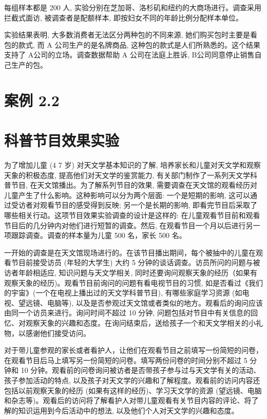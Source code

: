 \documentclass[10pt]{article}
\begin{document}
\begin{CJK*}{UTF8}{bsmi}
每组样本都是 200 人, 实验分别在芝加哥、洛杉矶和纽约的大商场进行。调查采用拦截式面访, 被调查者是配额样本, 即按妇女不同的年龄比例分配样本单位。

实验结果表明, 大多数消费者无法区分两种包的不同来源, 她们购买包时主要是看包的款式, 而 A 公司生产的是名牌商品, 这种包的款式是人们所熟悉的。这个结果支持了 $\mathrm{A}$公司的立场。调查数据帮助 A 公司在法庭上胜诉, B公司同意停止销售自己生产的包。

\section*{案例 2.2}
\section*{科普节目效果实验}
为了增加儿童 (4 7 岁) 对天文学基本知识的了解, 培养家长和儿童对天文学和观察天象的积极态度, 提高他们对天文学的鉴赏能力, 有关部门制作了一系列天文学科普节目, 在天文馆播出。为了解系列节目的效果, 需要调查在天文馆的观看经历对儿童产生了什么影响。这种影响可以分为两个层面: 一个是短期的影响, 这可以通过受访者对观看节目的感受得到反映; 另一个是长期的影响, 即看完节目后采取了哪些相关行动。这项节目效果实验调查的设计是这样的: 在儿童观看节目前和观看节目后的几分钟内对他们进行短暂的调查。然后, 在观看节目一个月以后进行另一项跟踪调查。调查的样本量为儿童 500 名，家长 500 名。

一开始的调查是在天文馆现场进行的。在该节目播出期间，每个被抽中的儿童在观看节目前接受访员 (年轻的大学生) 大约 5 分钟的谈话调查。访员所问的问题与被访者年龄相适应, 知识问题与天文学相关, 同时还要询问观察天象的经历（如果有观察天象的经历)。观看节目前询问的问题有看电视节目的习惯, 如是否看过《我们的宇宙》(一个在电视上播出过的天文学科普节目), 有哪些家庭学习资源 (如电视、望远镜、电脑等), 以及是否参观过天文馆或者类似的地方。观看后的询问应该由同一个访员来进行。询问时间不超过 10 分钟, 问题包括对节目中有关信息的回忆、对观察天象的兴趣和态度。在询问结束后，送给孩子一个和天文学相关的小礼物，以感谢他们接受访问。

对于带儿童参观的家长或者看护人，让他们在观看节目之前填写一份简短的问卷，在观看节目后马上填写另一份简短的问卷。填写两份问卷的时间分别不超过 5 分钟和 10 分钟。观看前的问卷询问被访者是否带孩子参与过与天文学有关的活动、孩子参加活动的特点, 以及孩子对天文学的兴趣和了解程度。观看前的访问内容还包括以前观察天象的经历 (如果有这样的经历)、学习天文学的资源 (望远镜、电脑和杂志等)。观看后的访问将了解看护人对带儿童观看有关节目内容的评论、将了解的知识运用到今后活动中的想法, 以及他们个人对天文学的兴趣和态度。


\end{CJK*}
\end{document}
